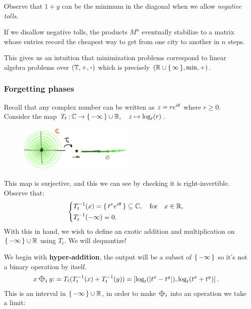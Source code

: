 \documentclass[12pt]{memoir}
\newcommand{\diamondplus}{\mathbin{\rotatebox[origin=c]{45}{$\boxtimes$}}} %
\begin{document}
Observe that $1+y$ can be the minimum in the diagonal when we allow \emph{negative tolls}.
\begin{Rmk}
If we disallow negative tolls, the products $M^n$ eventually stabilize to a matrix whose entries record the cheapest way to get from one city to another in $n$ steps.
\end{Rmk}
This gives us an intuition that minimization problems correspond to linear algebra problems over $(\bT,+,\.)$ which is precisely $(\mathbb{R}\cup\{\,\infty\,\},\min,+)$.

\subsubsection{Forgetting phases}

Recall that any complex number can be written as $z=re^{i\theta}$ where $r\geq 0$. Consider the map $T_t\mathbin{:}\mathbb{C}\to\{\,-\infty\,\}\cup\mathbb{R},\quad z\mapsto\log_t(r)$.
\begin{figure}[h!]
    \centering
    \includegraphics[width=0.5\textwidth]{figs/fig1-3.png}
\end{figure}
This map is surjective, and this we can see by checking it is right-invertible. Observe that:
$$
\left\lbrace
\begin{aligned}
    &T_t^{-1}(x)=\{\,t^xe^{i\theta}\,\}\subseteq\mathbb{C},\quad\text{for}\quad x\in\mathbb{R},\\
    &T_t^{-1}(-\infty)=0.
\end{aligned}
\right.
$$
With this in hand, we wish to define an exotic addition and multiplication on $\{\,-\infty\,\}\cup\mathbb{R}$ using $T_t$. We will dequantize!\par 
We begin with \textbf{hyper-addition}, the output will be a subset of $\{\,-\infty\,\}$ so it's not a binary operation by itself. 
$$x\diamondplus_t y\:= T_t(T_t^{-1}(x)+T_t^{-1}(y))=\bonj{\log_t(|t^x-t^y|),\log_t(t^x+t^y)}.$$
This is an interval in $\{\,-\infty\,\}\cup\mathbb{R}$, in order to make $\diamondplus_t$ into an operation we take a limit:
\end{document}
